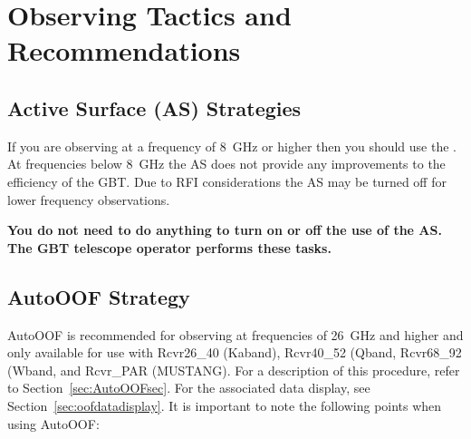 \chapter{Observing Tactics and Recommendations}\label{chap:tactics}


\section{Active Surface (AS) Strategies}

If you are observing at a frequency of 8~GHz or higher then you should
use the .  At frequencies below 8~GHz the \gls{AS} does not provide any
improvements to the efficiency of the \gls{GBT}. Due to \gls{RFI} considerations
the \gls{AS} may be turned off for lower frequency observations.

{\bf You do not need to do anything to turn on or off the use of  the \gls{AS}.
The \gls{GBT} telescope operator performs these tasks.}

\section{AutoOOF Strategy}\label{sec:oof_strategy}
AutoOOF is recommended for observing at frequencies of 26~GHz and higher and only
available for use with Rcvr26\_40 (\gls{Kaband}), Rcvr40\_52 (\gls{Qband},
Rcvr68\_92 (\gls{Wband}, and Rcvr\_PAR (\gls{MUSTANG}).
For a description of this procedure, refer to Section~\ref{sec:AutoOOFsec}.
For the associated data display, see Section~\ref{sec:oofdatadisplay}.
It is important to note the following points when using AutoOOF:

